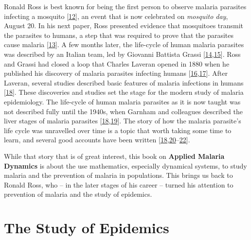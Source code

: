 \documentclass[
]{book}
\begin{document}
Ronald Ross is best known for being the first person to observe malaria parasites infecting a mosquito {[}\protect\hyperlink{ref-RossR1897PeculiarPigmented}{12}{]}, an event that is now celebrated on \emph{mosquito day}, August 20.
In his next paper, Ross presented evidence that mosquitoes transmit the parasites to humans, a step that was required to prove that the parasites cause malaria {[}\protect\hyperlink{ref-RossR1898RoleMosquito}{13}{]}.
A few months later, the life-cycle of human malaria parasites was described by an Italian team, led by Giovanni Battista Grassi {[}\protect\hyperlink{ref-GrassiB1898UlterioriRicerche}{14},\protect\hyperlink{ref-GrassiB1901StudiDi}{15}{]}.
Ross and Grassi had closed a loop that Charles Laveran opened in 1880 when he published his discovery of malaria parasites infecting humans {[}\protect\hyperlink{ref-Laveran1880}{16},\protect\hyperlink{ref-Laveran1884}{17}{]}.
After Laveran, several studies described basic features of malaria infections in humans {[}\protect\hyperlink{ref-GarnhamPCC1988HistoryDiscoveries}{18}{]}.
These discoveries and studies set the stage for the modern study of malaria epidemiology.
The life-cycle of human malaria parasites as it is now taught was not described fully until the 1940s, when Garnham and colleagues described the liver stages of malaria parasites {[}\protect\hyperlink{ref-GarnhamPCC1988HistoryDiscoveries}{18},\protect\hyperlink{ref-ShorttHE1948PreerythrocyticStage}{19}{]}.
The story of how the malaria parasite's life cycle was unravelled over time is a topic that worth taking some time to learn, and several good accounts have been written {[}\protect\hyperlink{ref-GarnhamPCC1988HistoryDiscoveries}{18},\protect\hyperlink{ref-Bruce-ChwattLJ1988HistoryMalaria}{20}--\protect\hyperlink{ref-CoxFEG2010HistoryDiscovery}{22}{]}.

While that story that is of great interest, this book on \textbf{Applied Malaria Dynamics} is about the use mathematics, especially dynamical systems, to study malaria and the prevention of malaria in populations. This brings us back to Ronald Ross, who -- in the later stages of his career -- turned his attention to prevention of malaria and the study of epidemics.

\hypertarget{the-study-of-epidemics}{%
\section{The Study of Epidemics}\label{the-study-of-epidemics}}
\end{document}
